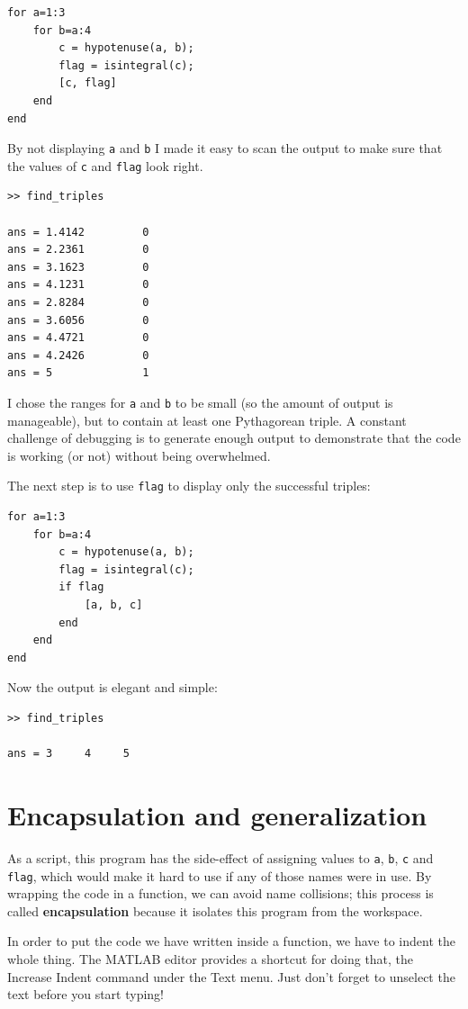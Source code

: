 \documentclass{book}
\begin{document}
\begin{verbatim}
for a=1:3
    for b=a:4
        c = hypotenuse(a, b);
        flag = isintegral(c);
        [c, flag]
    end
end
\end{verbatim}

By not displaying {\tt a} and {\tt b} I made it easy to scan the
output to make sure that the values of {\tt c} and {\tt flag}
look right.

\begin{verbatim}
>> find_triples

ans = 1.4142         0
ans = 2.2361         0
ans = 3.1623         0
ans = 4.1231         0
ans = 2.8284         0
ans = 3.6056         0
ans = 4.4721         0
ans = 4.2426         0
ans = 5              1
\end{verbatim}

I chose the ranges for {\tt a} and {\tt b} to be small
(so the amount of output is manageable), but to contain at
least one Pythagorean triple.  A constant challenge of debugging
is to generate enough output to demonstrate that the code is
working (or not) without being overwhelmed.

The next step is to use {\tt flag} to display only the successful
triples:

\begin{verbatim}
for a=1:3
    for b=a:4
        c = hypotenuse(a, b);
        flag = isintegral(c);
        if flag
            [a, b, c]
        end
    end
end
\end{verbatim}

Now the output is elegant and simple:

\begin{verbatim}
>> find_triples

ans = 3     4     5
\end{verbatim}




\section{Encapsulation and generalization}

As a script, this program has the side-effect of assigning values to
{\tt a}, {\tt b}, {\tt c} and {\tt flag}, which would make it hard to
use if any of those names were in use.  By wrapping the code in a
function, we can avoid name collisions; this process is called {\bf
encapsulation} because it isolates this program from the workspace.

In order to put the code we have written inside a function, we
have to indent the whole thing.  The MATLAB editor provides a
shortcut for doing that, the {\sf Increase Indent} command
under the {\sf Text} menu.  Just don't forget to unselect the
text before you start typing!
\end{document}
